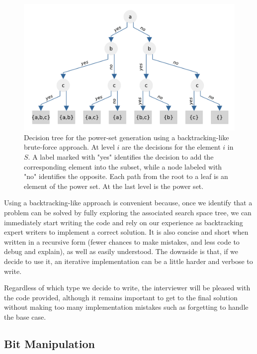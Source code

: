 \begin{figure}
    \centering
    \includegraphics[width=\textwidth]{sources/power_set/images/tree}
    \caption[Decision tree for the power-set generation using backtracking.]{Decision tree for the power-set generation using a backtracking-like brute-force approach. At level $i$ are the decisions for the element $i$ in $S$. A label marked with "yes" identifies the decision to add the corresponding element into the subset, while a node labeled with "no" identifies the opposite. Each path from the root to a leaf is an element of the power set. At the last level is the power set.}
    \label{ref:power_set_decision_trees}
\end{figure}

Using a backtracking-like approach is convenient because, once we identify that a problem can be solved by fully exploring the associated search space tree, we can immediately
start writing the code and rely on our experience as backtracking expert writers to implement a correct
solution. It is also concise and short when written in a recursive  form (fewer chances to make mistakes, and less code to debug and explain),  as well
as easily understood.
The downside is that, if we decide to use it, an iterative implementation can be a little harder and verbose to write.

Regardless of which type we decide to write, the interviewer will be pleased with the code provided,  although it remains important to get to the final solution
without making too many implementation mistakes such as forgetting to handle the base case.


\subsection{Bit Manipulation}

